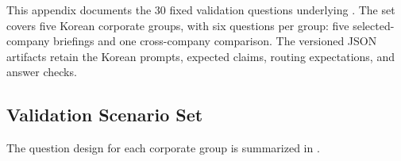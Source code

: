 This appendix documents the 30 fixed validation questions underlying . The set covers five Korean corporate groups, with six questions per group: five selected-company briefings and one cross-company comparison. The versioned JSON artifacts retain the Korean prompts, expected claims, routing expectations, and answer checks.

\subsection{Validation Scenario Set}
\label{app:scenario-inventory}

The question design for each corporate group is summarized in .

\begingroup
\footnotesize
\setlength{\tabcolsep}{3pt}
\renewcommand{\arraystretch}{1.12}
